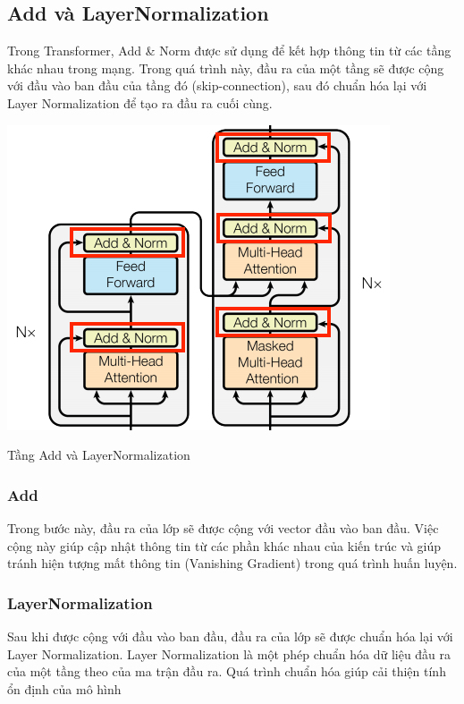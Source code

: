 \documentclass[a4paper, 12pt, openany]{book}
\begin{document}
\subsection{Add và LayerNormalization}
Trong Transformer, Add \& Norm được sử dụng để kết hợp thông tin
từ các tầng khác nhau trong mạng. Trong quá trình này, đầu ra của một tầng sẽ được
cộng với đầu vào ban đầu của tầng đó (skip-connection), sau đó chuẩn hóa lại với Layer
Normalization để tạo ra đầu ra cuối cùng.

\begin{minipage}{\linewidth}
    \captionsetup{type=figure}
    \centering
    \includegraphics[width=.8\linewidth]{./assets/images/Add+Norm.png}
    \caption{Tầng Add và LayerNormalization\cite{372429372_A_Stock_Price_Prediction_Method_Based_on_BiLSTM_and_Improved_Transformer}}
\end{minipage}
\subsubsection{Add}
Trong bước này, đầu ra của lớp sẽ được cộng với vector
đầu vào ban đầu. Việc cộng này giúp cập nhật thông tin từ các phần khác nhau của kiến
trúc và giúp tránh hiện tượng mất thông tin (Vanishing Gradient) trong quá trình huấn
luyện.

\subsubsection{LayerNormalization}
Sau khi được cộng với đầu vào ban đầu, đầu ra của lớp sẽ được chuẩn hóa lại với
Layer Normalization. Layer Normalization là một phép chuẩn hóa dữ liệu đầu ra của
một tầng theo của ma trận đầu ra. Quá
trình chuẩn hóa giúp cải thiện tính ổn định của mô hình
\end{document}
